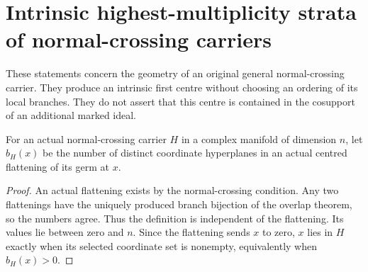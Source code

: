 \section{Intrinsic highest-multiplicity strata of normal-crossing carriers}
\label{sec:hironaka-normal-crossings-multiplicity-strata}

These statements concern the geometry of an original general
normal-crossing carrier. They produce an intrinsic first centre without
choosing an ordering of its local branches. They do not assert that this
centre is contained in the cosupport of an additional marked ideal.

\begin{definition}
\label{hir:general-nc-intrinsic-branch-multiplicity}
\leanok
For an actual normal-crossing carrier $H$ in a complex manifold of
dimension $n$, let $b_H(x)$ be the number of distinct coordinate
hyperplanes in an actual centred flattening of its germ at $x$.
\end{definition}
\begin{proof}
An actual flattening exists by the normal-crossing condition. Any two
flattenings have the uniquely produced branch bijection of the overlap
theorem, so the numbers agree. Thus the definition is independent of
the flattening. Its values lie between zero and $n$. Since the
flattening sends $x$ to zero, $x$ lies in $H$ exactly when its selected
coordinate set is nonempty, equivalently when $b_H(x)>0$.
\end{proof}

